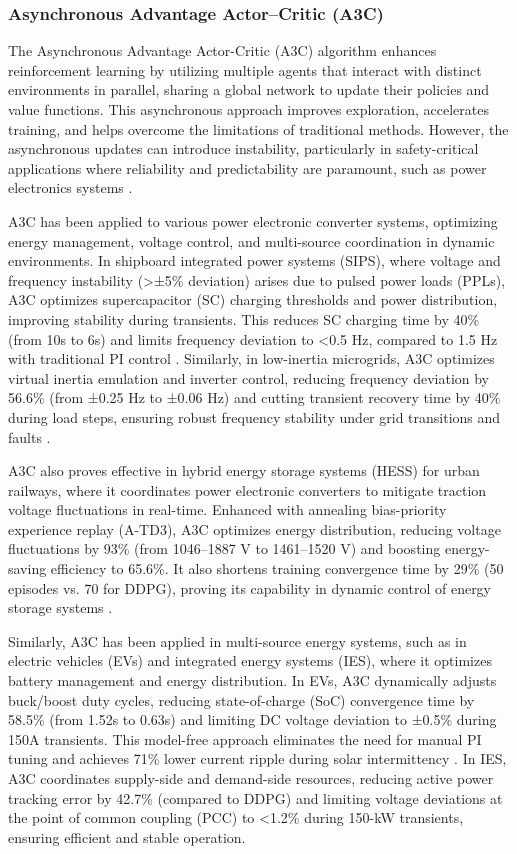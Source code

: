 \subsubsection{Asynchronous Advantage Actor–Critic (A3C)}

The Asynchronous Advantage Actor-Critic (A3C) algorithm enhances reinforcement learning by utilizing multiple agents that interact with distinct environments in parallel, sharing a global network to update their policies and value functions. This asynchronous approach improves exploration, accelerates training, and helps overcome the limitations of traditional methods. However, the asynchronous updates can introduce instability, particularly in safety-critical applications where reliability and predictability are paramount, such as power electronics systems \cite{mnih2016asynchronous}.

A3C has been applied to various power electronic converter systems, optimizing energy management, voltage control, and multi-source coordination in dynamic environments. In shipboard integrated power systems (SIPS), where voltage and frequency instability (>±5\% deviation) arises due to pulsed power loads (PPLs), A3C optimizes supercapacitor (SC) charging thresholds and power distribution, improving stability during transients. This reduces SC charging time by 40\% (from 10s to 6s) and limits frequency deviation to <0.5 Hz, compared to 1.5 Hz with traditional PI control \cite{zhang2022optimal}. Similarly, in low-inertia microgrids, A3C optimizes virtual inertia emulation and inverter control, reducing frequency deviation by 56.6\% (from ±0.25 Hz to ±0.06 Hz) and cutting transient recovery time by 40\% during load steps, ensuring robust frequency stability under grid transitions and faults \cite{egbomwan2022twin}.

A3C also proves effective in hybrid energy storage systems (HESS) for urban railways, where it coordinates power electronic converters to mitigate traction voltage fluctuations in real-time. Enhanced with annealing bias-priority experience replay (A-TD3), A3C optimizes energy distribution, reducing voltage fluctuations by 93\% (from 1046–1887 V to 1461–1520 V) and boosting energy-saving efficiency to 65.6\%. It also shortens training convergence time by 29\% (50 episodes vs. 70 for DDPG), proving its capability in dynamic control of energy storage systems \cite{wang2022power}.

Similarly, A3C has been applied in multi-source energy systems, such as in electric vehicles (EVs) and integrated energy systems (IES), where it optimizes battery management and energy distribution. In EVs, A3C dynamically adjusts buck/boost duty cycles, reducing state-of-charge (SoC) convergence time by 58.5\% (from 1.52s to 0.63s) and limiting DC voltage deviation to ±0.5\% during 150A transients. This model-free approach eliminates the need for manual PI tuning and achieves 71\% lower current ripple during solar intermittency \cite{chen2024asynchronous}. In IES, A3C coordinates supply-side and demand-side resources, reducing active power tracking error by 42.7\% (compared to DDPG) and limiting voltage deviations at the point of common coupling (PCC) to <1.2\% during 150-kW transients, ensuring efficient and stable operation.

